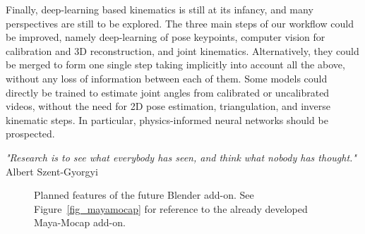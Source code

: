 Finally, deep-learning based kinematics is still at its infancy, and many perspectives are still to be explored. The three main steps of our workflow could be improved, namely deep-learning of pose keypoints, computer vision for calibration and 3D reconstruction, and joint kinematics. Alternatively, they could be merged to form one single step taking implicitly into account all the above, without any loss of information between each of them. Some models could directly be trained to estimate joint angles from calibrated or uncalibrated videos, without the need for 2D pose estimation, triangulation, and inverse kinematic steps. In particular, physics-informed neural networks should be prospected.



\vspace*{\fill}
\begin{flushright}
\textit{"Research is to see what everybody has seen, and think what nobody has thought."} \\
Albert Szent-Gyorgyi
\end{flushright}


\begin{figure}[hbtp]
      \centering
      \caption{Planned features of the future Blender add-on. See Figure~\ref{fig_mayamocap} for reference to the already developed Maya-Mocap add-on.}
      \label{fig_blendermocap}
\end{figure}




